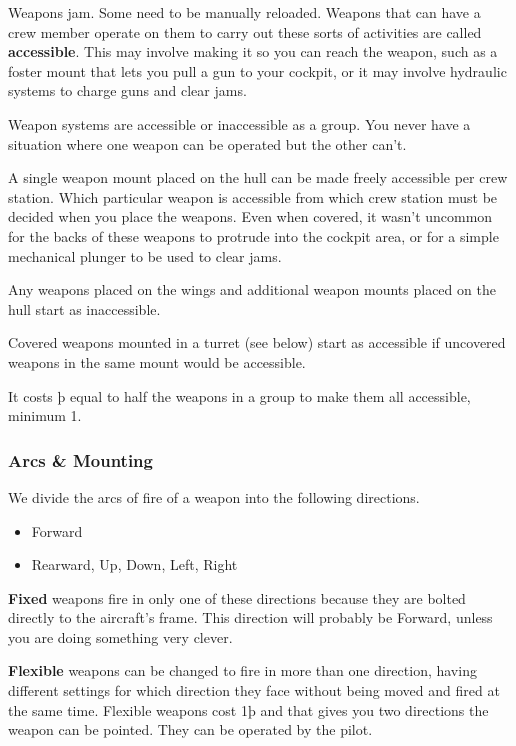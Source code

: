 \documentclass{article}
\begin{document}
\hfill\break
Weapons jam. Some need to be manually reloaded. Weapons that can have a
crew member operate on them to carry out these sorts of activities are
called \textbf{accessible}. This may involve making it so you can reach
the weapon, such as a foster mount that lets you pull a gun to your
cockpit, or it may involve hydraulic systems to charge guns and clear
jams.

Weapon systems are accessible or inaccessible as a group. You never have
a situation where one weapon can be operated but the other can't.

A single weapon mount placed on the hull can be made freely accessible
per crew station. Which particular weapon is accessible from which crew
station must be decided when you place the weapons. Even when covered,
it wasn't uncommon for the backs of these weapons to protrude into the
cockpit area, or for a simple mechanical plunger to be used to clear
jams.

Any weapons placed on the wings and additional weapon mounts placed on
the hull start as inaccessible.

Covered weapons mounted in a turret (see below) start as accessible if
uncovered weapons in the same mount would be accessible.

It costs þ equal to half the weapons in a group to make them all
accessible, minimum 1.

\subsubsection{Arcs \& Mounting}
\label{_Arcs_\&_Mounting}

We divide the arcs of fire of a weapon into the following directions.

\begin{itemize}
  \item Forward
  \item Rearward, Up, Down, Left, Right
\end{itemize}

\textbf{Fixed}{ weapons fire in only one of these
  directions because they are bolted directly to the aircraft's frame.
  This direction will probably be Forward, unless you are doing something
  very clever.}

\textbf{Flexible }{weapons can be changed to fire in more
  than one direction, having different settings for which direction they
  face without being moved and fired at the same time. Flexible weapons
  cost 1þ and that gives you two directions the weapon can be pointed.
  They can be operated by the pilot.}
\end{document}
